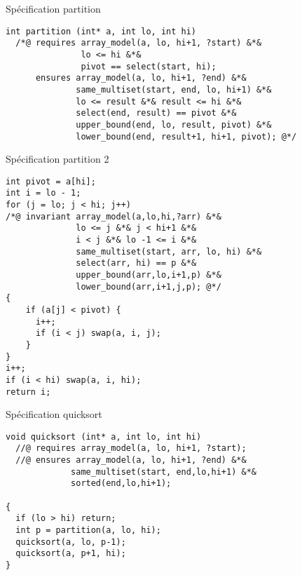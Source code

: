 \documentclass[]{beamer}
\begin{document}
\begin{frame}[fragile]{Sp\'ecification partition}
	\begin{lstlisting}[basicstyle=\footnotesize]
int partition (int* a, int lo, int hi)
  /*@ requires array_model(a, lo, hi+1, ?start) &*& 
               lo <= hi &*&
               pivot == select(start, hi);
      ensures array_model(a, lo, hi+1, ?end) &*& 
              same_multiset(start, end, lo, hi+1) &*&
              lo <= result &*& result <= hi &*&
              select(end, result) == pivot &*&
              upper_bound(end, lo, result, pivot) &*&
              lower_bound(end, result+1, hi+1, pivot); @*/
	\end{lstlisting}
	
\end{frame}







\begin{frame}[fragile]{Sp\'ecification partition 2}
	\begin{lstlisting}[basicstyle=\footnotesize]
int pivot = a[hi];
int i = lo - 1;
for (j = lo; j < hi; j++)
/*@ invariant array_model(a,lo,hi,?arr) &*&
              lo <= j &*& j < hi+1 &*& 
              i < j &*& lo -1 <= i &*& 
              same_multiset(start, arr, lo, hi) &*& 
              select(arr, hi) == p &*&
              upper_bound(arr,lo,i+1,p) &*& 
              lower_bound(arr,i+1,j,p); @*/
{
    if (a[j] < pivot) {
      i++;
      if (i < j) swap(a, i, j);
    }
}
i++;
if (i < hi) swap(a, i, hi);
return i;
	\end{lstlisting}

\end{frame}

\begin{frame}[fragile]{Sp\'ecification quicksort}
	\begin{lstlisting}[basicstyle=\footnotesize]
void quicksort (int* a, int lo, int hi)
  //@ requires array_model(a, lo, hi+1, ?start);
  //@ ensures array_model(a, lo, hi+1, ?end) &*& 
             same_multiset(start, end,lo,hi+1) &*& 
             sorted(end,lo,hi+1);

{
  if (lo > hi) return;
  int p = partition(a, lo, hi);
  quicksort(a, lo, p-1);
  quicksort(a, p+1, hi);
}
	\end{lstlisting}
\end{frame}
\end{document}
